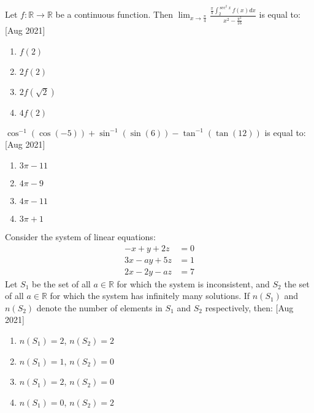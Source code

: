 \iffalse
    \title{2021}
    \author{AI24BTECH11030}
    \section{mcq-single}
\fi

    \item Let $f : \mathbb{R} \rightarrow \mathbb{R}$ be a continuous function. Then
    $\lim_{x \to \frac{\pi}{4}} \frac{\frac{\pi}{4} \int_{2}^{\sec^2 x} f(x) dx}{ x^2 - \frac{\pi^2}{16}}$
    is equal to: \hfill [Aug 2021]
    \begin{multicols}{4}
        \begin{enumerate}
            \item $f(2)$
            \item $2f(2)$
            \item $2f(\sqrt{2})$
            \item $4f(2)$
        \end{enumerate}
    \end{multicols}
    
    \item $\cos^{-1}(\cos(-5)) + \sin^{-1}(\sin(6)) - \tan^{-1}(\tan(12))$ is equal to: \hfill [Aug 2021]
    \begin{multicols}{4}
        \begin{enumerate}
            \item $3\pi - 11$
            \item $4\pi - 9$
            \item $4\pi - 11$
            \item $3\pi + 1$
        \end{enumerate}
    \end{multicols}

    \item Consider the system of linear equations:
    \begin{align*}
        -x + y + 2z &= 0 \\
        3x - ay + 5z &= 1 \\
        2x - 2y - az &= 7
    \end{align*}
    Let $S_1$ be the set of all $a \in \mathbb{R}$ for which the system is inconsistent, and $S_2$ the set of all $a \in \mathbb{R}$ for which the system has infinitely many solutions. If $n(S_1)$ and $n(S_2)$ denote the number of elements in $S_1$ and $S_2$ respectively, then: \hfill [Aug 2021]
    \begin{multicols}{2}
        \begin{enumerate}
            \item $n(S_1) = 2$, $n(S_2) = 2$
            \item $n(S_1) = 1$, $n(S_2) = 0$
            \item $n(S_1) = 2$, $n(S_2) = 0$
            \item $n(S_1) = 0$, $n(S_2) = 2$
        \end{enumerate}
    \end{multicols}
    
